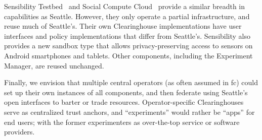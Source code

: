 Sensibility Testbed~\cite{zhuang2014sensibility} and Social Compute
Cloud~\cite{caton2014social} provide a similar breadth in capabilities
as Seattle. However, they only operate a partial infrastructure, and
reuse much of Seattle's. Their own Clearinghouse
implementations have user interfaces and policy implementations
that differ from Seattle's. Sensibility also provides a new sandbox
type that allows privacy-preserving access to sensors on Android
smartphones and tablets. Other components, including the Experiment
Manager, are reused unchanged.

Finally, we envision that multiple central operators (as often
assumed in \gls{fc}) could set up their own instances of
all components, and then federate using Seattle's open interfaces
to barter or trade resources. %
Operator-specific Clearinghouses serve as centralized trust
anchors, and ``experiments'' would rather be ``apps'' for
end users; with the former experimenters as over-the-top service or
software providers.
